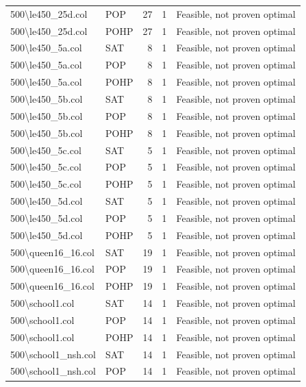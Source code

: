 \begin{longtable}{llrrl}
500\textbackslash{}le450\_25d.col & POP & 27 & 1 & Feasible, not proven optimal \\
500\textbackslash{}le450\_25d.col & POHP & 27 & 1 & Feasible, not proven optimal \\
500\textbackslash{}le450\_5a.col & SAT & 8 & 1 & Feasible, not proven optimal \\
500\textbackslash{}le450\_5a.col & POP & 8 & 1 & Feasible, not proven optimal \\
500\textbackslash{}le450\_5a.col & POHP & 8 & 1 & Feasible, not proven optimal \\
500\textbackslash{}le450\_5b.col & SAT & 8 & 1 & Feasible, not proven optimal \\
500\textbackslash{}le450\_5b.col & POP & 8 & 1 & Feasible, not proven optimal \\
500\textbackslash{}le450\_5b.col & POHP & 8 & 1 & Feasible, not proven optimal \\
500\textbackslash{}le450\_5c.col & SAT & 5 & 1 & Feasible, not proven optimal \\
500\textbackslash{}le450\_5c.col & POP & 5 & 1 & Feasible, not proven optimal \\
500\textbackslash{}le450\_5c.col & POHP & 5 & 1 & Feasible, not proven optimal \\
500\textbackslash{}le450\_5d.col & SAT & 5 & 1 & Feasible, not proven optimal \\
500\textbackslash{}le450\_5d.col & POP & 5 & 1 & Feasible, not proven optimal \\
500\textbackslash{}le450\_5d.col & POHP & 5 & 1 & Feasible, not proven optimal \\
500\textbackslash{}queen16\_16.col & SAT & 19 & 1 & Feasible, not proven optimal \\
500\textbackslash{}queen16\_16.col & POP & 19 & 1 & Feasible, not proven optimal \\
500\textbackslash{}queen16\_16.col & POHP & 19 & 1 & Feasible, not proven optimal \\
500\textbackslash{}school1.col & SAT & 14 & 1 & Feasible, not proven optimal \\
500\textbackslash{}school1.col & POP & 14 & 1 & Feasible, not proven optimal \\
500\textbackslash{}school1.col & POHP & 14 & 1 & Feasible, not proven optimal \\
500\textbackslash{}school1\_nsh.col & SAT & 14 & 1 & Feasible, not proven optimal \\
500\textbackslash{}school1\_nsh.col & POP & 14 & 1 & Feasible, not proven optimal \\

\end{longtable}
